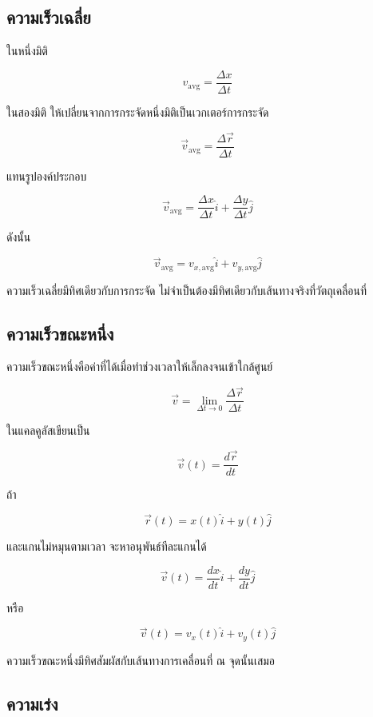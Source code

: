\subsection{ความเร็วเฉลี่ย}

ในหนึ่งมิติ

\[
v_{\text{avg}}=\frac{\Delta x}{\Delta t}
\]

ในสองมิติ ให้เปลี่ยนจากการกระจัดหนึ่งมิติเป็นเวกเตอร์การกระจัด

\[
\vec{v}_{\text{avg}}=\frac{\Delta \vec{r}}{\Delta t}
\]

แทนรูปองค์ประกอบ

\[
\vec{v}_{\text{avg}}
=
\frac{\Delta x}{\Delta t}\hat{i}
+
\frac{\Delta y}{\Delta t}\hat{j}
\]

ดังนั้น

\[
\vec{v}_{\text{avg}}
=
v_{x,\text{avg}}\hat{i}
+
v_{y,\text{avg}}\hat{j}
\]

\begin{tcolorbox}[title=ข้อควรจำ]
ความเร็วเฉลี่ยมีทิศเดียวกับการกระจัด ไม่จำเป็นต้องมีทิศเดียวกับเส้นทางจริงที่วัตถุเคลื่อนที่
\end{tcolorbox}

\subsection{ความเร็วขณะหนึ่ง}

ความเร็วขณะหนึ่งคือค่าที่ได้เมื่อทำช่วงเวลาให้เล็กลงจนเข้าใกล้ศูนย์

\[
\vec{v}
=
\lim_{\Delta t\to 0}
\frac{\Delta \vec{r}}{\Delta t}
\]

ในแคลคูลัสเขียนเป็น

\[
\vec{v}(t)=\frac{d\vec{r}}{dt}
\]

ถ้า

\[
\vec{r}(t)=x(t)\hat{i}+y(t)\hat{j}
\]

และแกนไม่หมุนตามเวลา จะหาอนุพันธ์ทีละแกนได้

\[
\vec{v}(t)=\frac{dx}{dt}\hat{i}+\frac{dy}{dt}\hat{j}
\]

หรือ

\[
\vec{v}(t)=v_x(t)\hat{i}+v_y(t)\hat{j}
\]

\begin{tcolorbox}[title=ข้อควรจำ]
ความเร็วขณะหนึ่งมีทิศสัมผัสกับเส้นทางการเคลื่อนที่ ณ จุดนั้นเสมอ
\end{tcolorbox}

\subsection{ความเร่ง}

